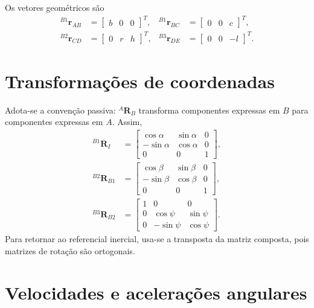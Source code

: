 \documentclass[11pt,a4paper]{article}
\newcommand{\bvec}[1]{\bm{#1}}
\newcommand{\R}[2]{{}^{#1}\!\bvec R_{#2}}
\newcommand{\vct}[2]{{}^{#1}\!\bvec{#2}}
\begin{document}
Os vetores geométricos são
\begin{align}
\vct{B1}{r}_{AB}&=\begin{bmatrix}b&0&0\end{bmatrix}^{\!T}, &
\vct{B1}{r}_{BC}&=\begin{bmatrix}0&0&c\end{bmatrix}^{\!T},\\
\vct{B2}{r}_{CD}&=\begin{bmatrix}0&r&h\end{bmatrix}^{\!T}, &
\vct{B3}{r}_{DE}&=\begin{bmatrix}0&0&-l\end{bmatrix}^{\!T}.
\end{align}

\section{Transformações de coordenadas}

Adota-se a convenção passiva: $\R{A}{B}$ transforma componentes expressas em
$B$ para componentes expressas em $A$. Assim,
\begin{align}
\R{B1}{I}&=
\begin{bmatrix}
\cos\alpha&\sin\alpha&0\\-\sin\alpha&\cos\alpha&0\\0&0&1
\end{bmatrix},\\
\R{B2}{B1}&=
\begin{bmatrix}
\cos\beta&\sin\beta&0\\-\sin\beta&\cos\beta&0\\0&0&1
\end{bmatrix},\\
\R{B3}{B2}&=
\begin{bmatrix}
1&0&0\\0&\cos\psi&\sin\psi\\0&-\sin\psi&\cos\psi
\end{bmatrix}.
\label{eq:rotations}
\end{align}
Para retornar ao referencial inercial, usa-se a transposta da matriz composta,
pois matrizes de rotação são ortogonais.

\section{Velocidades e acelerações angulares}
\end{document}
